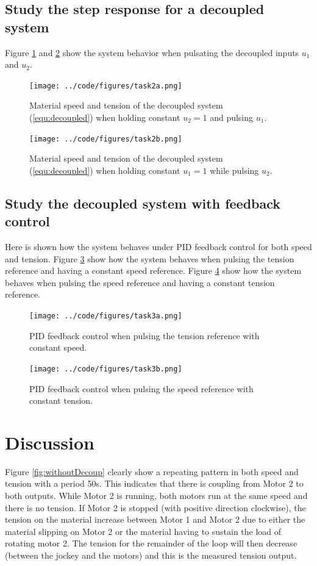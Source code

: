 \documentclass[a4paper, titlepage]{article}
\begin{document}
\subsection{Study the step response for a decoupled system}
Figure \ref{fig:withDecoupSpeedA} and \ref{fig:withDecoupSpeedB} show the system behavior when pulsating the decoupled inputs $u_1$ and $u_2$.

\begin{figure}[H]
\center
\texttt{[image: ../code/figures/task2a.png]}
\caption{Material speed and tension of the decoupled system (\ref{equ:decoupled}) when holding constant $u_2 = 1$ and pulsing $u_1$.}
\label{fig:withDecoupSpeedA}
\end{figure}

\begin{figure}[H]
\center
\texttt{[image: ../code/figures/task2b.png]}
\caption{Material speed and tension of the decoupled system (\ref{equ:decoupled}) when holding constant $u_1 = 1$ while pulsing $u_2$.}
\label{fig:withDecoupSpeedB}
\end{figure}


\subsection{Study the decoupled system with feedback control}
Here is shown how the system behaves under PID feedback control for both speed and tension.
Figure \ref{fig:withFeedbackDecoupSpeedA} show how the system behaves when pulsing the tension reference and having a constant speed reference.
Figure \ref{fig:withFeedbackDecoupSpeedB} show how the system behaves when pulsing the speed reference and having a constant tension reference.

\begin{figure}[H]
\center
\texttt{[image: ../code/figures/task3a.png]}
\caption{PID feedback control when pulsing the tension reference with constant speed.}
\label{fig:withFeedbackDecoupSpeedA}
\end{figure}

\begin{figure}[H]
\center
\texttt{[image: ../code/figures/task3b.png]}
\caption{PID feedback control when pulsing the speed reference with constant tension.}
\label{fig:withFeedbackDecoupSpeedB}
\end{figure}


\section{Discussion}
Figure \ref{fig:withoutDecoup} clearly show a repeating pattern in both speed and tension with a period 50s.
This indicates that there is coupling from Motor 2 to both outputs.
While Motor 2 is running, both motors run at the same speed and there is no tension.
If Motor 2 is stopped (with positive direction clockwise), the tension on the material increase between Motor 1 and Motor 2 due to either the material slipping on Motor 2 or the material having to sustain the load of rotating motor 2.
The tension for the remainder of the loop will then decrease (between the jockey and the motors) and this is the measured tension output.
\end{document}
